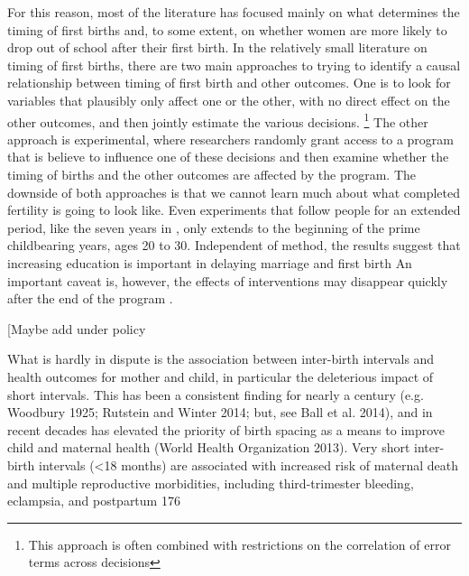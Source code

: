 \documentclass[letterpaper,12pt]{article}
\begin{document}
For this reason, most of the literature has focused mainly on what
determines the timing of first births and, to some extent, on whether
women are more likely to drop out of school after their first birth.
In the relatively small literature on timing of first births, there are
two main approaches to trying to identify a causal relationship between
timing of first birth and other outcomes.
One is to look for variables that plausibly only affect one or the
other, with no direct effect on the other outcomes, and then jointly
estimate the various decisions.%
\footnote{
This approach is often combined with restrictions on the correlation of
error terms across decisions} The other approach is experimental, where
researchers randomly grant access to a program that is believe to
influence one of these decisions and then examine whether the timing of
births and the other outcomes are affected by the program.
The downside of both approaches is that we cannot learn much about what
completed fertility is going to look like.
Even experiments that follow people for an extended period, like the
seven years in \citet{Duflo2015}, only extends to the beginning of the
prime childbearing years, ages 20 to 30.
Independent of method, the results suggest that increasing education is
important in delaying marriage and first birth
\citep{Duflo2015,Marchetta2016} An important caveat is, however, the
effects of interventions may disappear quickly after the end of the
program \citep{Baird2016}.



[Maybe add under policy

\citep{Casterline2016}

What is hardly in dispute is the association between inter-birth
intervals and health outcomes for mother and child, in particular the
deleterious impact of short intervals. This has been a consistent
finding for nearly a century (e.g. Woodbury 1925; Rutstein and Winter
2014; but, see Ball et al. 2014), and in recent decades has elevated the
priority of birth spacing as a means to improve child and maternal
health (World Health Organization 2013). Very short inter-birth
intervals (<18 months) are associated with increased risk of maternal
death and multiple reproductive morbidities, including third-trimester
bleeding, eclampsia, and postpartum 176
\end{document}

